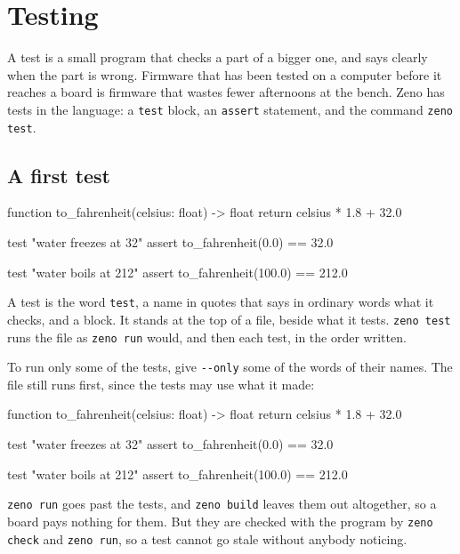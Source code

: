 \chapter{Testing}\label{ch-testing}

A test is a small program that checks a part of a bigger one, and
says clearly when the part is wrong. Firmware that has been tested on
a computer before it reaches a board is firmware that wastes fewer
afternoons at the bench. Zeno has tests in the language: a
\verb|test| block, an \verb|assert| statement, and the command
\verb|zeno test|.

\section{A first test}

\begin{zeno}[file=temperature.zeno, dir=first, cmd=zeno test {file}]
function to_fahrenheit(celsius: float) -> float {
    return celsius * 1.8 + 32.0
}

test "water freezes at 32" {
    assert to_fahrenheit(0.0) == 32.0
}

test "water boils at 212" {
    assert to_fahrenheit(100.0) == 212.0
}
\end{zeno}

A test is the word \verb|test|, a name in quotes that says in ordinary
words what it checks, and a block. It stands at the top of a file,
beside what it tests. \verb|zeno test| runs the file as
\verb|zeno run| would, and then each test, in the order written.

To run only some of the tests, give \verb|--only| some of the words of
their names. The file still runs first, since the tests may use what
it made:

\begin{zeno}[file=temperature.zeno, dir=first, show=no, cmd=zeno test --only boils {file}]
function to_fahrenheit(celsius: float) -> float {
    return celsius * 1.8 + 32.0
}

test "water freezes at 32" {
    assert to_fahrenheit(0.0) == 32.0
}

test "water boils at 212" {
    assert to_fahrenheit(100.0) == 212.0
}
\end{zeno}

\verb|zeno run| goes past the tests, and \verb|zeno build| leaves them
out altogether, so a board pays nothing for them. But they are checked
with the program by \verb|zeno check| and \verb|zeno run|, so a test
cannot go stale without anybody noticing.

